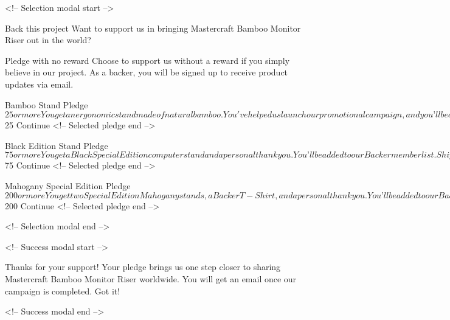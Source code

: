 
<!-- Selection modal start -->

Back this project
Want to support us in bringing Mastercraft Bamboo Monitor Riser out in the world?

Pledge with no reward
Choose to support us without a reward if you simply believe in our project. As a backer, 
you will be signed up to receive product updates via email.

Bamboo Stand
Pledge $25 or more
You get an ergonomic stand made of natural bamboo. You've helped us launch our promotional campaign, and
you’ll be added to a special Backer member list.
101 left

<!-- Selected pledge start -->
Enter your pledge
$25
Continue
<!-- Selected pledge end -->

Black Edition Stand
Pledge $75 or more
You get a Black Special Edition computer stand and a personal thank you. You’ll be added to our Backer
member list. Shipping is included.
64 left

<!-- Selected pledge start -->
Enter your pledge
$75
Continue
<!-- Selected pledge end -->

Mahogany Special Edition
Pledge $200 or more
You get two Special Edition Mahogany stands, a Backer T-Shirt, and a personal thank you. You’ll be added
to our Backer member list. Shipping is included.
0 left

<!-- Selected pledge  start -->
Enter your pledge
$200
Continue
<!-- Selected pledge end -->

<!-- Selection modal end -->

<!-- Success modal start -->

Thanks for your support!
Your pledge brings us one step closer to sharing Mastercraft Bamboo Monitor Riser worldwide. You will get
an email once our campaign is completed.
Got it!

<!-- Success modal end -->